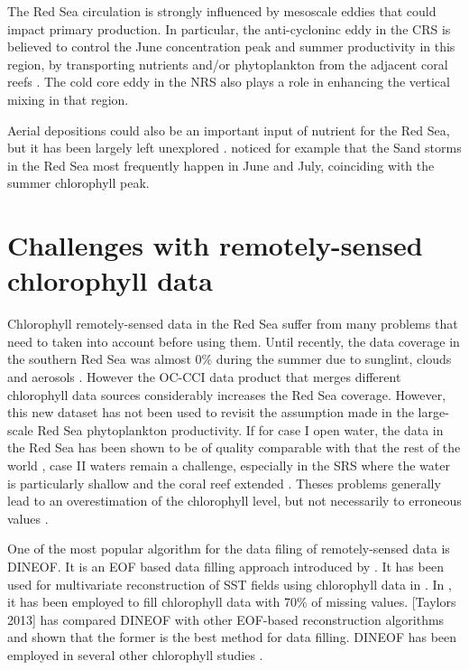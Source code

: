 The Red Sea circulation is strongly influenced by mesoscale eddies \cite{Yao2014} that could impact primary production.  In particular, the anti-cycloninc eddy in the CRS is believed to control the June concentration peak and summer productivity in this region, by transporting nutrients and/or phytoplankton from the adjacent coral reefs \cite{Raitsos2013}. The cold core eddy in the NRS also plays a role in enhancing the vertical mixing in that region.

Aerial depositions could also be an important input of nutrient for the Red Sea, but it has been largely left unexplored \cite{Triantafyllou2014}. \cite{Raitsos2013} noticed for example that the Sand storms in the Red Sea most frequently happen in June and July, coinciding with the summer chlorophyll peak. 

\section{Challenges with remotely-sensed chlorophyll data}

Chlorophyll remotely-sensed data in the Red Sea suffer from many problems that need to taken into account before using them. Until recently, the data coverage in the southern Red Sea was almost 0\% during the summer due to sunglint, clouds and aerosols \cite{Racault}. However the OC-CCI data product that merges different chlorophyll data sources considerably increases the Red Sea coverage. However, this new dataset has not been used to revisit the assumption made in the large-scale Red Sea phytoplankton productivity. If for case I open water, the data in the Red Sea has been shown to be of quality comparable with  that the rest of the world \cite{Brewin2013}, case II waters remain a challenge, especially in the SRS where the water is particularly shallow and the coral reef extended \cite{Triantafyllou2014, Raitsos2013}. Theses problems generally lead to an overestimation of the chlorophyll level, but not necessarily to erroneous values \cite{Raitsos2013}.

One of the most popular algorithm for the data filing of remotely-sensed data is DINEOF. It is an EOF based data filling approach introduced by \cite{Beckers2003}. It has been used for multivariate reconstruction of SST fields using chlorophyll data in \cite{Alvera2007}. In \cite{Sicarjobs2011}, it has been employed to fill chlorophyll data with 70\% of missing values. [Taylors 2013] has compared DINEOF with other EOF-based reconstruction algorithms and shown that the former is the best method for data filling. DINEOF has been employed in several other chlorophyll studies \cite{Miles2010, Waite2013}.

